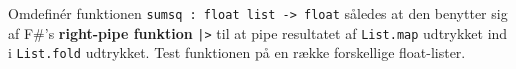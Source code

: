 Omdefinér funktionen \lstinline{sumsq : float list -> float} således
at den benytter sig af F\#'s \textbf{right-pipe funktion} \lstinline{|>} til at
pipe resultatet af \lstinline{List.map} udtrykket ind
i \lstinline{List.fold} udtrykket.
%
Test funktionen på en række forskellige float-lister.

